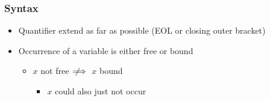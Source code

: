 \subsubsection{Syntax}
\begin{itemize}
     Set of function symbols $\mathcal{F}$ and set of predicate symbols $\mathcal{P}$
        \begin{itemize}
            \item $f^i$/$p^i$ indicate the arity of function $f$/predicate $p$
        \end{itemize}
     For set of variables $\mathcal{V}$, the smallest set where:
        \begin{itemize}
            \item $x \in \text{ Term if } x \in \mathcal{V}$
            \item $f^n(t_1, \dots ,t_n) \in \text{ Term if } f^n \in \mathcal{F} \text{ and } t_j \in \text{ Term } \forall 1 \le j \le n$
        \end{itemize}
     Smallest set where:
        \begin{itemize}
            \item $\perp \in \text{Form}$
            \item $p^n(t_1, \dots , t_n) \in \text{Form if } p^n \in \mathcal{P} \text{ and } t_j \in \text{Term } \forall 1 \le j \le n$
            \item $A \circ B \in \text{Form if } A \in \text{Form, } B \in \text{Form, and } \circ \in \{\wedge, \vee, \to\}$
            \item $Qx. A \in \text{Form if } A \in \text{Form, } x \in \mathcal{V}, \text{ and } Q \in \{\forall, \exists\}$
        \end{itemize}
    \item Quantifier extend as far as possible (EOL or closing outer bracket)
    \item Occurrence of a variable is either free or bound
        \begin{itemize}
             Rename bound variables
                \begin{itemize}
                    \item Keep binding structure (association between quantifier and variables)
                    \item Prevent capture (renaming to the name of a free variable)
                    \item Names of bound variables are irrelevant
                \end{itemize}
            \item $x$ not free $\;\not\!\!\!\implies$ $x$ bound
                \begin{itemize}
                    \item $x$ could also just not occur
                \end{itemize}
        \end{itemize}
\end{itemize}

